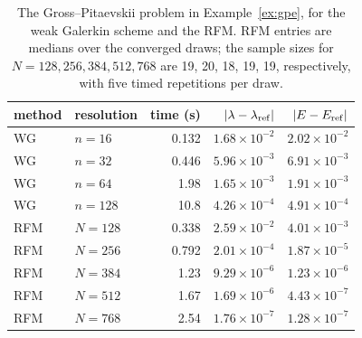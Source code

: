 \begin{table}[!htbp]
\centering
\small
\setlength{\tabcolsep}{4pt}
\caption{The Gross--Pitaevskii problem in Example~\ref{ex:gpe}, for the weak Galerkin scheme and the RFM. RFM entries are medians over the converged draws; the sample sizes for \(N=128,256,384,512,768\) are 19, 20, 18, 19, 19, respectively, with five timed repetitions per draw.}
\label{tab:nonlinear_gpe_comparison}
\begin{tabular}{llrrr}
\toprule
method & resolution & time (s) & \(\lvert\lambda-\lambda_{\rm ref}\rvert\) & \(\lvert E-E_{\rm ref}\rvert\)\\
\midrule
WG & \(n=16\) & 0.132 & \(1.68\times 10^{-2}\) & \(2.02\times 10^{-2}\)\\
WG & \(n=32\) & 0.446 & \(5.96\times 10^{-3}\) & \(6.91\times 10^{-3}\)\\
WG & \(n=64\) & 1.98 & \(1.65\times 10^{-3}\) & \(1.91\times 10^{-3}\)\\
WG & \(n=128\) & 10.8 & \(4.26\times 10^{-4}\) & \(4.91\times 10^{-4}\)\\
\midrule
RFM & \(N=128\) & 0.338 & \(2.59\times 10^{-2}\) & \(4.01\times 10^{-3}\)\\
RFM & \(N=256\) & 0.792 & \(2.01\times 10^{-4}\) & \(1.87\times 10^{-5}\)\\
RFM & \(N=384\) & 1.23 & \(9.29\times 10^{-6}\) & \(1.23\times 10^{-6}\)\\
RFM & \(N=512\) & 1.67 & \(1.69\times 10^{-6}\) & \(4.43\times 10^{-7}\)\\
RFM & \(N=768\) & 2.54 & \(1.76\times 10^{-7}\) & \(1.28\times 10^{-7}\)\\
\bottomrule
\end{tabular}
\end{table}
